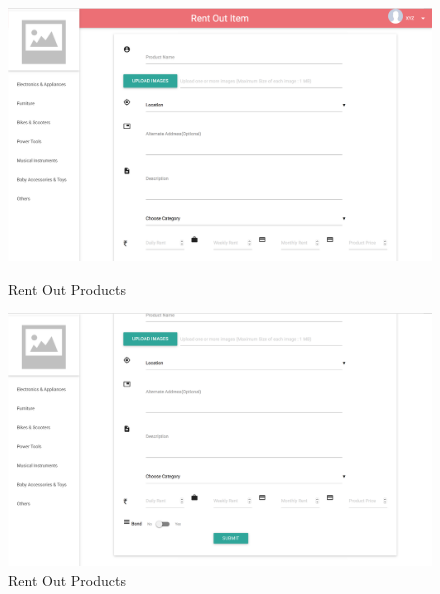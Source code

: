 \documentclass[11pt]{report}
\begin{document}
    \begin{figure}[h]
  \centering
    \includegraphics[width=6in]{rentout1.png} 
	\caption{Rent Out Products}
\vspace{0.5in}
  \centering
    \includegraphics[width=6in]{rentout2.png} 
	\caption{Rent Out Products}
	\end{figure}
\end{document}
